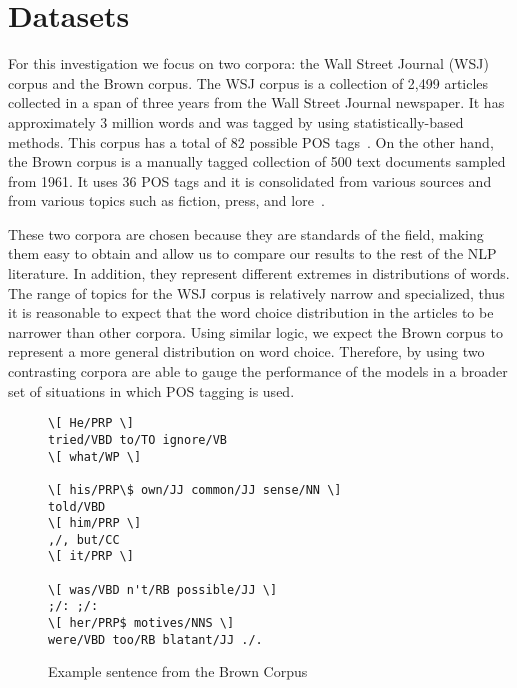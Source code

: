 
\section{Datasets}
For this investigation we focus on two corpora: the Wall Street Journal (WSJ) corpus and the Brown corpus. The WSJ corpus is a collection of 2,499 articles collected in a span of three years from the Wall Street Journal newspaper. It has approximately 3 million words and was tagged by using statistically-based methods. This corpus has a total of 82 possible POS tags~\cite{wsjCorpus}. On the other hand, the Brown corpus is a manually tagged collection of 500 text documents sampled from 1961. It uses 36 POS tags and it is consolidated from various sources and from various topics such as fiction, press, and lore~\cite{wsjCorpus}.

These two corpora are chosen because they are standards of the field, making them easy to obtain and allow us to compare our results to the rest of the NLP literature. In addition, they represent different extremes in distributions of words. The range of topics for the WSJ corpus is relatively narrow and specialized, thus it is reasonable to expect that the word choice distribution in the articles to be narrower than other corpora. Using similar logic, we expect the Brown corpus to represent a more general distribution on word choice. Therefore, by using two contrasting corpora are able to gauge the performance of the models in a broader set of situations in which POS tagging is used.

\begin{figure}[ht]
 \begin{Verbatim}[frame=single,framesep=5mm]
\[ He/PRP \]
tried/VBD to/TO ignore/VB
\[ what/WP \]

\[ his/PRP\$ own/JJ common/JJ sense/NN \]
told/VBD
\[ him/PRP \]
,/, but/CC
\[ it/PRP \]

\[ was/VBD n't/RB possible/JJ \]
;/: ;/:
\[ her/PRP$ motives/NNS \]
were/VBD too/RB blatant/JJ ./.
\end{Verbatim}
\caption{Example sentence from the Brown Corpus~\cite{brownCorpus} \label{brownExample}}
\end{figure}

